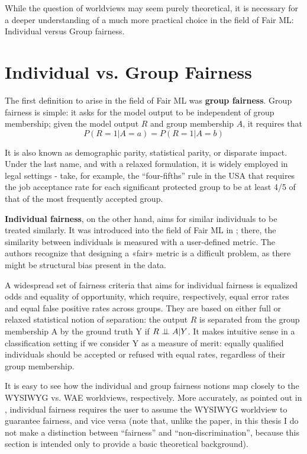 While the question of worldviews may seem purely theoretical, it is necessary for a deeper understanding of a much more practical choice in the field of Fair ML: Individual versus Group fairness.


\section{Individual vs. Group Fairness}\label{sect:1_2}

The first definition to arise in the field of Fair ML was \textbf{group fairness}. Group fairness is simple: it asks for the model output to be independent of group membership; given the model output $R$ and group membership $A$, it requires that 
\[
P(R=1|A=a) = P(R=1|A=b)
\]

It is also known as demographic parity, statistical parity, or disparate impact. Under the last name, and with a relaxed formulation, it is widely employed in legal settings - take, for example, the “four-fifths” rule in the USA that requires the job acceptance rate for each significant protected group to be at least 4/5 of that of the most frequently accepted group.

\textbf{Individual fairness}, on the other hand, aims for similar individuals to be treated similarly. It was introduced into the field of Fair ML in \cite{dwork2011fairness}; there, the similarity between individuals is measured with a user-defined metric. The authors recognize that designing a «fair» metric is a difficult problem, as there might be structural bias present in the data.

A widespread set of fairness criteria that aims for individual fairness is equalized odds and equality of opportunity, which require, respectively, equal error rates and equal false positive rates across groups. They are based on either full or relaxed statistical notion of separation: the output $R$ is separated from the group membership A by the ground truth Y if $R \perp \!\!\! \perp A | Y$. It makes intuitive sense in a classification setting if we consider Y as a measure of merit: equally qualified individuals should be accepted or refused with equal rates, regardless of their group membership.

It is easy to see how the individual and group fairness notions map closely to the WYSIWYG vs. WAE worldviews, respectively. More accurately, as pointed out in \cite{1609.07236}, individual fairness requires the user to assume the WYSIWYG worldview to guarantee fairness, and vice versa (note that, unlike the paper, in this thesis I do not make a distinction between “fairness” and “non-discrimination”, because this section is intended only to provide a basic theoretical background).

